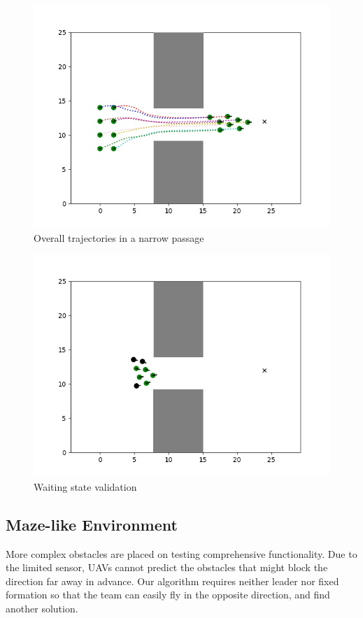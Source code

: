 \begin{figure}[H]
    \centering
    \includegraphics[scale=1]{figures/trail_overall.png}
    \caption{Overall trajectories in a narrow passage}
    \label{fig:narrow}
\end{figure}
\begin{figure}[H]
    \centering
    \includegraphics[scale=1]{figures/trail_enter.png}
    \caption{Waiting state validation}
    \label{fig:wait}
\end{figure}

\subsection{Maze-like Environment}
More complex obstacles are placed on testing comprehensive functionality. Due to the limited sensor, UAVs cannot predict the obstacles that might block the direction far away in advance. Our algorithm requires neither leader nor fixed formation so that the team can easily fly in the opposite direction, and find another solution.

